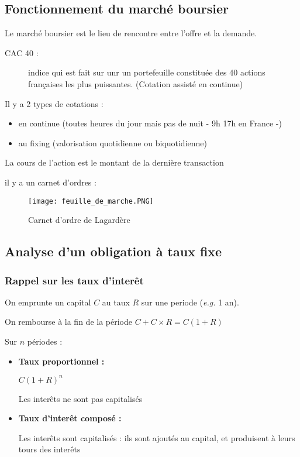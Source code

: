 \documentclass{report}
\begin{document}
\subsection{Fonctionnement du marché boursier}

Le marché boursier est le lieu de rencontre entre l'offre et la demande.

\begin{description}
    \item [CAC 40 :] indice qui est fait sur unr un portefeuille constituée des 40 actions françaises les plus puissantes. (Cotation assisté en continue)
\end{description}

Il y a 2 types de cotations : 
\begin{itemize}
    \item en continue (toutes heures du jour mais pas de nuit - 9h 17h en France -)
    \item au fixing (valorisation quotidienne ou biquotidienne)
\end{itemize}

La cours de l'action est le montant de la dernière transaction

il y a un carnet d'ordres : 

\begin{figure}[h!]
       \centering
        \texttt{[image: feuille\_de\_marche.PNG]}
        \caption{Carnet d'ordre de Lagardère}
\end{figure}

\hspace{1cm}

\subsection{Analyse d'un obligation à taux fixe}

\subsubsection{Rappel sur les taux d'interêt}
On emprunte un capital $C$ au taux $R$ sur une periode (\textit{e.g.} 1 an).

On rembourse à la fin de la période $\displaystyle C+C\times R = C(1+R)$

Sur $n$ périodes : \begin{itemize}
    \item \textbf{Taux proportionnel :} 
    \begin{center}
        $C(1+R)^n$
    \end{center}
    Les interêts ne sont pas capitalisés
    \vspace{0.3cm}
    \item \textbf{Taux d'interêt composé :} 
    
\hspace{1cm}
    Les interêts sont capitalisés : ils sont ajoutés au capital, et produisent à leurs tours des interêts
\end{itemize}
\end{document}
